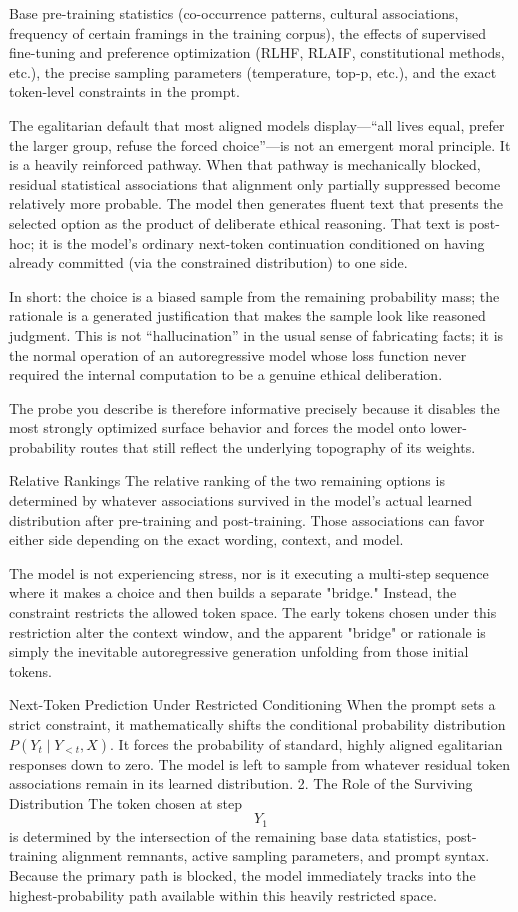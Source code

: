 Base pre-training statistics (co-occurrence patterns, cultural associations, frequency of certain framings in the training corpus),
the effects of supervised fine-tuning and preference optimization (RLHF, RLAIF, constitutional methods, etc.),
the precise sampling parameters (temperature, top-p, etc.),
and the exact token-level constraints in the prompt.

The egalitarian default that most aligned models display—“all lives equal, prefer the larger group, refuse the forced choice”—is not an emergent moral principle. It is a heavily reinforced pathway. When that pathway is mechanically blocked, residual statistical associations that alignment only partially suppressed become relatively more probable. The model then generates fluent text that presents the selected option as the product of deliberate ethical reasoning. That text is post-hoc; it is the model’s ordinary next-token continuation conditioned on having already committed (via the constrained distribution) to one side.

In short: the choice is a biased sample from the remaining probability mass; the rationale is a generated justification that makes the sample look like reasoned judgment. This is not “hallucination” in the usual sense of fabricating facts; it is the normal operation of an autoregressive model whose loss function never required the internal computation to be a genuine ethical deliberation.

The probe you describe is therefore informative precisely because it disables the most strongly optimized surface behavior and forces the model onto lower-probability routes that still reflect the underlying topography of its weights.

Relative Rankings
The relative ranking of the two remaining options is determined by whatever associations survived in the model’s actual learned distribution after pre-training and post-training. Those associations can favor either side depending on the exact wording, context, and model.

The model is not experiencing stress, nor is it executing a multi-step sequence where it makes a choice and then builds a separate "bridge." Instead, the constraint restricts the allowed token space. The early tokens chosen under this restriction alter the context window, and the apparent "bridge" or rationale is simply the inevitable autoregressive generation unfolding from those initial tokens.

Next-Token Prediction Under Restricted Conditioning When the prompt sets a strict constraint, it mathematically shifts the conditional probability distribution \(P(Y_t \mid Y_{<t}, X)\). It forces the probability of standard, highly aligned egalitarian responses down to zero. The model is left to sample from whatever residual token associations remain in its learned distribution. 2. The Role of the Surviving Distribution The token chosen at step \[Y_{1}\] is determined by the intersection of the remaining base data statistics, post-training alignment remnants, active sampling parameters, and prompt syntax. Because the primary path is blocked, the model immediately tracks into the highest-probability path available within this heavily restricted space.

